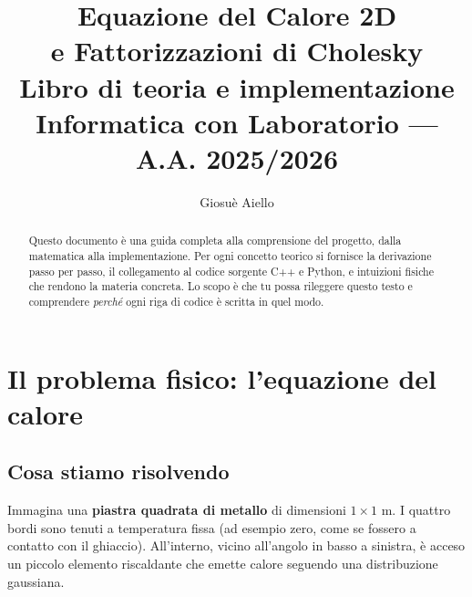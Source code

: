 \documentclass[a4paper,11pt]{article}
\title{%
  \Huge\textbf{Equazione del Calore 2D}\\[8pt]
  \Large\textbf{e Fattorizzazioni di Cholesky}\\[14pt]
  \large Libro di teoria e implementazione\\[6pt]
  \normalsize Informatica con Laboratorio — A.A. 2025/2026
}
\author{Giosuè Aiello}
\date{}
\theoremstyle{definition}
\begin{document}
\maketitle
\thispagestyle{empty}

\begin{abstract}
Questo documento è una guida completa alla comprensione del progetto, dalla matematica alla
implementazione. Per ogni concetto teorico si fornisce la derivazione passo per passo, il
collegamento al codice sorgente C++ e Python, e intuizioni fisiche che rendono la materia concreta.
Lo scopo è che tu possa rileggere questo testo e comprendere \emph{perché} ogni riga di codice
è scritta in quel modo.
\end{abstract}

\tableofcontents
\newpage

\section{Il problema fisico: l'equazione del calore}

\subsection{Cosa stiamo risolvendo}

Immagina una \textbf{piastra quadrata di metallo} di dimensioni $1\times1$ m.
I quattro bordi sono tenuti a temperatura fissa (ad esempio zero, come se fossero a
contatto con il ghiaccio). All'interno, vicino all'angolo in basso a sinistra, è
acceso un piccolo elemento riscaldante che emette calore seguendo una distribuzione
gaussiana.
\end{document}

